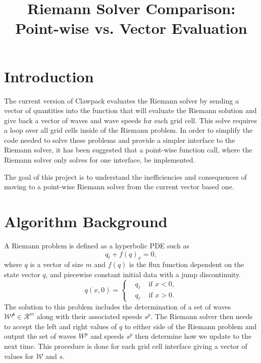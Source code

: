\documentclass[]{article}
\title{Riemann Solver Comparison:  Point-wise vs. Vector Evaluation}
\author{  }
\date{}
\begin{document}
\ifpdf
{}
\else
{}
\fi

\maketitle

\section{Introduction}
The current version of Clawpack evaluates the Riemann solver by sending a vector of quantities into the function that will evaluate the Riemann solution and give back a vector of waves and wave speeds for each grid cell.  This solve requires a loop over all grid cells inside of the Riemann problem.  In order to simplify the code needed to solve these problems and provide a simpler interface to the Riemann solver, it has been suggested that a point-wise function call, where the Riemann solver only solves for one interface, be implemented.

The goal of this project is to understand the inefficiencies and consequences of moving to a point-wise Riemann solver from the current vector based one. 

\section{Algorithm Background}
A Riemann problem is defined as a hyperbolic PDE such as
\begin{equation}
    q_t + f(q)_x = 0,
\end{equation}
where $q$ is a vector of size $m$ and $f(q)$ is the flux function dependent on the state vector $q$, and piecewise constant initial data with a jump discontinuity.
\begin{equation}
    q(x,0) = \left \{ \begin{aligned}
    &q_\ell ~~~~~ \text{if } x < 0,\\
    &q_r ~~~~~ \text{if } x > 0. \end{aligned} \right .
\end{equation}
The solution to this problem includes the determination of a set of waves $\mathcal{W^p} \in \mathcal{R}^m$ along with their associated speeds $s^p$.  The Riemann solver then needs to accept the left and right values of $q$ to either side of the Riemann problem and output the set of waves $W^p$ and speeds $s^p$ then determine how we update to the next time.  This procedure is done for each grid cell interface giving a vector of values for $\mathcal{W}$ and $s$.  
\end{document}

